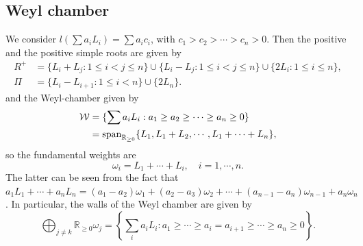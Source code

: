 \documentclass{report}
\begin{document}
\subsection{Weyl chamber}
We consider $l(\sum a_i L_i) = \sum a_i c_i$, with $c_1 > c_2 > \cdots > c_n>0$.
Then the positive and the positive simple roots are given by
\begin{align*}
    R^+ &= \{ L_i + L_j : 1 \leq i < j \leq n \} \cup \{ L_i - L_j : 1 \leq i < j \leq n \} \cup \{ 2L_i : 1 \leq i \leq n \},\\
    \Pi &= \{ L_i - L_{i+1} : 1 \leq i < n \} \cup \{ 2L_n \}.
\end{align*}
and the Weyl-chamber given by
\begin{align*}
    \mathcal W &= \{ \sum a_i L_i : a_1 \geq a_2 \geq \cdots \geq a_n \geq 0 \}\\
    &= \operatorname{span}_{\mathbb R_{\geq 0}} \{ L_1, L_1 + L_2, \cdots, L_1 + \cdots + L_n \},
\end{align*}
so the fundamental weights are
\[
\omega_i = L_1 + \cdots + L_i, \quad i = 1, \cdots, n.
\]
The latter can be seen from the fact that $a_1 L_1 + \cdots + a_n L_n = (a_1 - a_2)\omega_1 + (a_2 - a_3) \omega_2 + \cdots + (a_{n-1} - a_n) \omega_{n-1} + a_n \omega_n$.
In particular, the walls of the Weyl chamber are given by
\[
\bigoplus_{j \neq k} \mathbb R_{\geq 0} \omega_j = \left\{ \sum_{i} a_i L_i : a_1 \geq \cdots \geq a_{i} = a_{i+1} \geq \cdots \geq  a_n \geq 0 \right\}.
\]
\end{document}

